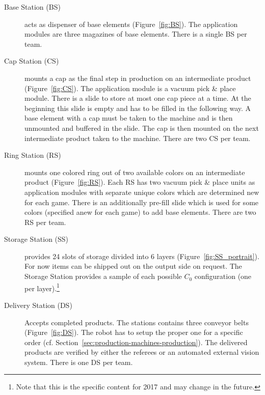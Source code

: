 \documentclass[12pt,twoside]{article}
\newcommand{\refsec}[1]{Section~\ref{#1}}
\newcommand{\reffig}[1]{Figure~\ref{#1}}
\begin{document}
\begin{description}
\item[Base Station (BS)] acts as dispenser of base elements
  (\reffig{fig:BS}). The application modules are three magazines of
  base elements. There is a single BS per team.

\item[Cap Station (CS)] mounts a cap as the final step in production
  on an intermediate product (\reffig{fig:CS}). The application module
  is a vacuum pick \& place module. There is a slide to store at most
  one cap piece at a time. At the beginning this slide is empty and
  has to be filled in the following way.  A base element with a cap
  must be taken to the machine and is then unmounted and buffered in
  the slide. The cap is then mounted on the next intermediate product
  taken to the machine. There are two CS per team.

\item[Ring Station (RS)] mounts one colored ring out of two available
  colors on an intermediate product (\reffig{fig:RS}). Each RS has two
  vacuum pick \& place units as application modules with separate
  unique colors which are determined new for each game. There is an
  additionally pre-fill slide which is used for some colors (specified
  anew for each game) to add base elements. There are two RS per team.
  
\item[Storage Station (SS)] provides 24 slots of storage divided into
  6 layers (\reffig{fig:SS_portrait}). For now items can be  shipped out on the output side on
  request. The Storage Station provides a sample of each possible
  $C_0$ configuration (one per layer).\footnote{Note that this is the
    specific content for 2017 and may change in the future.}

\item[Delivery Station (DS)] Accepts completed products. The stations
  contains three conveyor belts (\reffig{fig:DS}). The robot has to
  setup the proper one for a specific order
  (cf. \refsec{sec:production-machines-production}). The delivered
  products are verified by either the referees or an automated
  external vision system. There is one DS per team.
\end{description}
\end{document}
